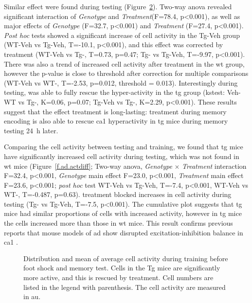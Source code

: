 Similar effect were found during testing (Figure~\ref{f.ad.acttest}). Two-way \gls{anova} revealed significant interaction of \textit{Genotype} and \textit{Treatment}(F=78.4, p<0.001), as well as major effects of \textit{Genotype} (F=32.7, p<0.001) and \textit{Treatment} (F=27.4, p<0.001). \textit{Post hoc} tests showed a significant increase of cell activity in the Tg-Veh group (WT-Veh vs Tg-Veh, T=-10.1, p<0.001), and this effect was corrected by \tglu{} treatment (WT-Veh vs Tg-\glu, T=0.73, p=0.47; Tg-\glu{} vs Tg-Veh, T=-9.97, p<0.001). There was also a trend of increased cell activity after \tglu{} treatment in the \gls{wt} group, however the p-value is close to threshold after correction for multiple comparisons (WT-Veh vs WT-\glu, T=-2.53, p=0.012, threshold = 0.013). Interestingly during testing, \tglu{} was able to fully rescue the hyper-activity in the \gls{tg} group (\gls{kstest}: Veh-WT vs Tg-\glu, K=0.06, p=0.07; Tg-Veh vs Tg-\glu, K=2.29, p<0.001). These results suggest that the effect \tglu{} treatment is long-lasting: treatment during memory encoding is also able to rescue \gls{ca1} hyperactivity in \gls{tg} mice during memory testing \SI{24}{\hour} later.

Comparing the cell activity between testing and training, we found that \gls{tg} mice have significantly increased cell activity during testing,  which was not found in \gls{wt} mice (Figure~\ref{f.ad.actdiff}; Two-way \gls{anova}, \textit{Genotype} $\times$ \textit{Treatment} interaction F=32.4, p<0.001, \textit{Genotype} main effect F=23.0, p<0.001, \textit{Treatment} main effect F=23.6, p<0.001; \textit{post hoc} test WT-Veh vs Tg-Veh, T=-7.4, p<0.001, WT-Veh vs WT-\glu, T=-0.487, p=0.63). \tglu{} treatment blocked increases in cell activity during testing (Tg-\glu{} vs Tg-Veh, T=-7.5, p<0.001). The cumulative plot suggests that \gls{tg} mice had similar proportions of cells with increased activity, however in \gls{tg} mice the cells increased more than those in \gls{wt} mice. This result confirms previous reports that mouse models of \gls{ad} show disrupted excitation-inhibition balance in \gls{ca1} \citep{palop16}.


\begin{figure}[h]
    \begin{subfigure}[h]{0.9\textwidth}
        
        \caption{\label{f.ad.acttrain}}
    \end{subfigure}
    \begin{subfigure}[h]{0.9\textwidth}
        
        \caption{\label{f.ad.acttest}}
    \end{subfigure}
    \caption[Cell activity during training and memory test.]{Distribution and mean of average cell activity during  training before foot shock and  memory test. Cells in the Tg mice are significantly more active, and this is rescued by \tglu{} treatment. Cell numbers are listed in the legend with parenthesis. The cell activity are measured in \gls{au}. \label{f.ad.activity}}
\end{figure}

